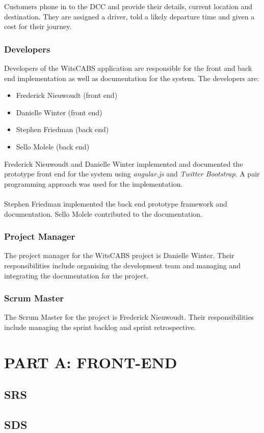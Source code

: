 \documentclass[12pt]{article}
\begin{document}
Customers phone in to the DCC and provide their details, current location and destination. They are assigned a driver, told a likely departure time and given a cost for their journey.

\subsubsection{Developers}
Developers of the WitsCABS application are responsible for the front and back end implementation as well as documentation for the system. The developers are:
\begin{itemize}
\item Frederick Nieuwoudt (front end)
\item Danielle Winter (front end)
\item Stephen Friedman (back end)
\item Sello Molele (back end)
\end{itemize} 
Frederick Nieuwoudt and Danielle Winter implemented and documented the prototype front end for the system using \textit{angular.js} and \textit{Twitter Bootstrap}. A pair programming approach was used for the implementation.\\\\
Stephen Friedman implemented the back end prototype framework and documentation. Sello Molele contributed to the documentation.
\subsubsection{Project Manager}
The project manager for the WitsCABS project is Danielle Winter. Their responsibilities include organising the development team and managing and integrating the documentation for the project. 
\subsubsection{Scrum Master}
The Scrum Master for the project is Frederick Nieuwoudt. Their responsibilities include managing the sprint backlog and sprint retrospective.   

\newpage
\section{PART A: FRONT-END}
\subsection{SRS}
\subsection{SDS}
\end{document}
